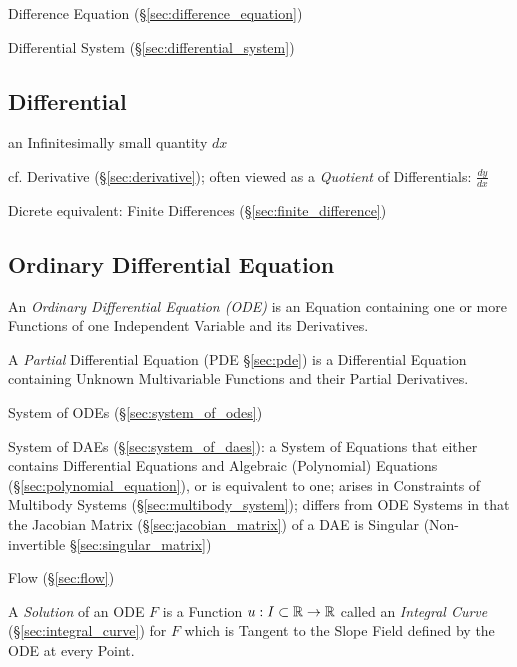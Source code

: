 \fist Difference Equation (\S\ref{sec:difference_equation})

\fist Differential System (\S\ref{sec:differential_system})




\subsection{Differential}\label{sec:differential}

an Infinitesimally small quantity $dx$

cf. Derivative (\S\ref{sec:derivative}); often viewed as a \emph{Quotient} of
Differentials: $\frac{dy}{dx}$

\fist Dicrete equivalent: Finite Differences (\S\ref{sec:finite_difference})



\subsection{Ordinary Differential Equation}\label{sec:ode}

An \emph{Ordinary Differential Equation (ODE)} is an Equation containing one or
more Functions of one Independent Variable and its Derivatives.

\fist A \emph{Partial} Differential Equation (PDE
\S\ref{sec:pde}) is a Differential Equation
containing Unknown Multivariable Functions and their Partial Derivatives.

\fist System of ODEs (\S\ref{sec:system_of_odes})

\fist System of DAEs (\S\ref{sec:system_of_daes}): a System of Equations that
either contains Differential Equations and Algebraic (Polynomial) Equations
(\S\ref{sec:polynomial_equation}), or is equivalent to one; arises in
Constraints of Multibody Systems (\S\ref{sec:multibody_system}); differs from
ODE Systems in that the Jacobian Matrix (\S\ref{sec:jacobian_matrix}) of a DAE
is Singular (Non-invertible \S\ref{sec:singular_matrix})

\fist Flow (\S\ref{sec:flow})

A \emph{Solution} of an ODE $F$ is a Function $u : I \subset \mathbb{R} \rightarrow
\mathbb{R}$ called an \emph{Integral Curve} (\S\ref{sec:integral_curve}) for $F$
which is Tangent to the Slope Field defined by the ODE at every Point.


